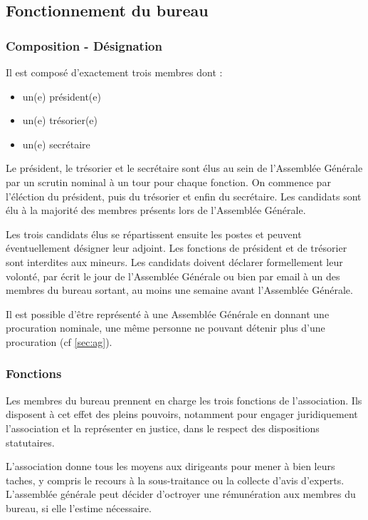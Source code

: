 \documentclass[a4paper,french,10pt]{article}
\begin{document}
\subsection{Fonctionnement du bureau}

\subsubsection*{Composition - Désignation}
\label{sec:comp-design}
Il est composé d'exactement trois membres dont :
\begin{itemize}
\item un(e) président(e)
\item un(e) trésorier(e)
\item un(e) secrétaire
\end{itemize}

Le président, le trésorier et le secrétaire sont élus au sein de
l'Assemblée Générale par un scrutin nominal à un tour pour chaque
fonction. On commence par l'éléction du président, puis du trésorier
et enfin du secrétaire.  Les candidats sont élu à la majorité des
membres présents lors de l'Assemblée Générale.

Les trois candidats élus se répartissent ensuite les postes et peuvent
éventuellement désigner leur adjoint. Les fonctions de président et de
trésorier sont interdites aux mineurs. Les candidats doivent déclarer
formellement leur volonté, par écrit le jour de l'Assemblée Générale
ou bien par email à un des membres du bureau sortant, au moins une
semaine avant l'Assemblée Générale.


Il est possible d’être représenté à une Assemblée Générale en donnant
une procuration nominale, une même personne ne pouvant détenir plus
d’une procuration (cf \ref{sec:ag}).


\subsubsection{Fonctions}
\label{sec:fonctions}

Les membres du bureau prennent en charge les trois fonctions de
l’association.  Ils disposent à cet effet des pleins pouvoirs,
notamment pour engager juridiquement l’association et la représenter
en justice, dans le respect des dispositions statutaires.

L’association donne tous les moyens aux dirigeants pour mener à bien
leurs taches, y compris le recours à la sous-traitance ou la collecte
d’avis d’experts. L’assemblée générale peut décider d’octroyer une
rémunération aux membres du bureau, si elle l’estime nécessaire.
\end{document}
